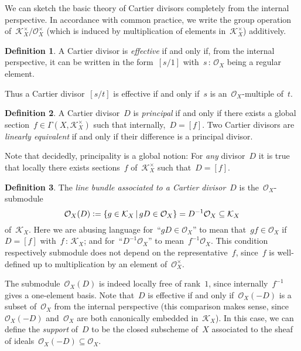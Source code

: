 \documentclass[10pt,reqno,a4paper]{amsbook}
\makeatletter
\theoremstyle{definition}
\newtheorem{defn}{Definition}[section]
\theoremstyle{plain}
\newtheorem{prop}[defn]{Proposition}
\theoremstyle{remark}
\renewcommand{\O}{\mathcal{O}}
\newcommand{\K}{\mathcal{K}}
\newcommand{\?}{\,{:}\,}
\renewcommand{\_}{\mathpunct{.}\,}
\newcommand{\defeq}{\vcentcolon=}
\renewenvironment{proof}[1][\proofname]{\par
  \pushQED{\qed}%
  \normalfont \topsep6\p@\@plus6\p@\relax
  \trivlist
  \item[\hskip\labelsep
        \itshape
    #1\@addpunct{.}]\ignorespaces
}{%
  \popQED\endtrivlist\@endpefalse
}
\makeatother
\begin{document}
We can sketch the basic theory of Cartier divisors completely from the internal
perspective. In accordance with common practice, we write the group
operation of~$\K_X^\times/\O_X^\times$ (which is induced by multiplication of elements
in~$\K_X^\times$) additively.

\begin{defn}\label{defn:effective-cartier-divisor}
A Cartier divisor is \emph{effective} if and only if, from the
internal perspective, it can be written in the form~$[s/1]$ with~$s\?\O_X$
being a regular element.\end{defn}

Thus a Cartier divisor~$[s/t]$ is effective if and only if~$s$ is
an~$\O_X$-multiple of~$t$.

\begin{defn}A Cartier divisor~$D$ is \emph{principal} if and only if there
exists a global section~$f \in \Gamma(X,\K_X^\times)$ such that internally,~$D = [f]$.
Two Cartier divisors are \emph{linearly equivalent} if and only if their
difference is a principal divisor.
\end{defn}

Note that decidedly, principality is a global notion: For \emph{any} divisor~$D$ it is
true that locally there exists sections~$f$ of~$\K_X^\times$ such that~$D = [f]$.

\begin{defn}\label{defn:line-bundle-of-divisor}
The \emph{line bundle associated to a Cartier divisor}~$D$
is the~$\O_X$-submodule
\[ \O_X(D) \defeq \{ g \in \K_X \,|\, g D \in \O_X \} = D^{-1} \O_X \subseteq \K_X
\]
of~$\K_X$. Here we are abusing language for~``$gD \in \O_X$'' to mean that~$gf
\in \O_X$ if~$D = [f]$ with~$f\?\K_X$; and for~``$D^{-1} \O_X$'' to
mean~$f^{-1}\O_X$. This condition respectively submodule does not depend on the
representative~$f$, since~$f$ is well-defined up to multiplication by an element
of~$\O_X^\times$.\end{defn}

The submodule~$\O_X(D)$ is indeed locally free of rank~$1$, since
internally~$f^{-1}$ gives a one-element basis. Note that~$D$ is effective if
and only if~$\O_X(-D)$ is a subset of~$\O_X$ from the internal perspective
(this comparison makes sense, since~$\O_X(-D)$ and~$\O_X$ are both canonically
embedded in~$\K_X$). In
this case, we can define the \emph{support} of~$D$ to be the closed subscheme
of~$X$ associated to the sheaf of ideals~$\O_X(-D) \subseteq \O_X$.

\end{document}
